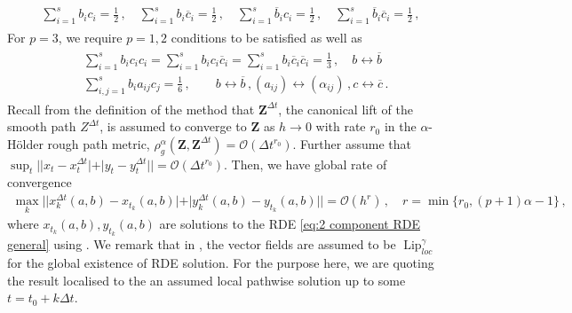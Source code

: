 \documentclass[11pt, oneside]{article}
\numberwithin{equation}{section}
\theoremstyle{definition}
\newcommand{\ob}[1]{\overline{#1}}
\newcommand{\mc}[1]{\mathcal{#1}}
\newcommand{\mcal}[1]{\mc{#1}}
\begin{document}
\begin{align}
    \begin{split}
        \sum_{i=1}^s b_ic_i = \frac{1}{2} \,,\quad \sum_{i=1}^s b_i\ob{c}_i = \frac{1}{2} \,,\quad \sum_{i=1}^s \ob{b}_i c_i = \frac{1}{2} \,,\quad \sum_{i=1}^s \ob{b}_i \ob{c}_i = \frac{1}{2} \,,
    \end{split}
\end{align}
For $p=3$, we require $p=1,2$ conditions to be satisfied as well as
\begin{align}
    \begin{split}
        &\sum_{i=1}^s b_ic_ic_i = \sum_{i=1}^s b_ic_i\ob{c}_i = \sum_{i=1}^s b_i\ob{c}_i\ob{c}_i =  \frac{1}{3}\,,\quad b \leftrightarrow \ob{b}\,\\
        &\sum_{i,j=1}^s b_i a_{ij}c_j = \frac{1}{6}\,,\quad \quad b \leftrightarrow \ob{b}\,, (a_{ij})\leftrightarrow (\alpha_{ij})\,, c \leftrightarrow \ob{c}\,.
    \end{split}
\end{align}
Recall from the definition of the method that $\mathbf{Z}^{\Delta t}$, the canonical lift of the smooth path $Z^{\Delta t}$, is assumed to converge to $\mathbf{Z}$ as $h \rightarrow 0$ with rate $r_0$ in the $\alpha$-H\"older rough path metric, $\rho^\alpha_g(\mathbf{Z}, \mathbf{Z}^{\Delta t}) = \mcal{O}(\Delta t^{r_0})$. Further assume that $\sup_t||x_t - x^{\Delta t}_t| + |y_t - y^{\Delta t}_t|| = \mcal{O}(\Delta t^{r_0})$. Then, we have global rate of convergence
\begin{align*}
    \max_{k} ||x_k^{\Delta t}(a,b) - x_{t_k}(a,b)| + |y_k^{\Delta t}(a,b) - y_{t_k}(a,b)|| = \mcal{O}(h^r)\,,\quad r = \min\{r_0, (p+1)\alpha - 1\}\,,
\end{align*}
where $x_{t_k}(a,b), y_{t_k}(a,b)$ are solutions to the RDE \eqref{eq:2 component RDE general} using \cite[Thm. 4.2]{RR2020}. We remark that in \cite[Thm. 4.2]{RR2020}, the vector fields are assumed to be $\operatorname{Lip}^\gamma_{loc}$ for the global existence of RDE solution. For the purpose here, we are quoting the result localised to the an assumed local pathwise solution up to some $t = t_0 + k\Delta t$. 
\end{document}
